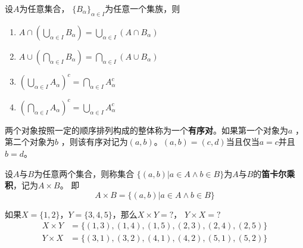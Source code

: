   \begin{Thm}
设$A$为任意集合， $\{B_{\alpha}\}_{\alpha \in I}$为任意一个集族，则
\begin{enumerate}
\item $A \cap (\bigcup_{\alpha \in I}B_{\alpha}) = \bigcup_{\alpha \in I}(A \cap B_{\alpha})$
\item $A \cup (\bigcap_{\alpha \in I}B_{\alpha}) = \bigcap_{\alpha \in I}(A \cup B_{\alpha})$
\item $(\bigcup_{\alpha \in I}A_{\alpha})^c=\bigcap_{\alpha\in I}A_{\alpha}^c$
\item $(\bigcap_{\alpha \in I}A_{\alpha})^c=\bigcup_{\alpha\in I}A_{\alpha}^c$
\end{enumerate}
\end{Thm}
  \begin{Def}
    两个对象按照一定的顺序排列构成的整体称为一个{\bfseries 有序对}。如果第一个对象为$a$ ，第二个对象为$b$ ，则该有序对记为$(a,b)$。$(a,b)=(c,d)$当且仅当$a=c$并且$b=d$。
  \end{Def}
  \begin{Def}
    设$A$与$B$为任意两个集合，则称集合 $\{(a,b)|a\in A \land b \in B\}$为$A$与$B$的{\bfseries 笛卡尔乘积}，记为$A \times B$。
即
\begin{equation*}
  A \times B = \{(a,b)|a \in A \land b \in B\}
\end{equation*}
  \end{Def}
  \begin{Example}
    如果$X=\{1,2\}$，$Y=\{3,4,5\}$，那么$X \times Y = ?$， $Y \times X = ?$
    \begin{equation*}
      \begin{split}
       X \times Y &= \{ (1,3), (1,4), (1,5), (2,3), (2,4), (2, 5) \}\\
       Y \times X &= \{(3,1), (3,2), (4,1), (4,2), (5,1), (5,2)\}
      \end{split}
    \end{equation*}
  \end{Example}


